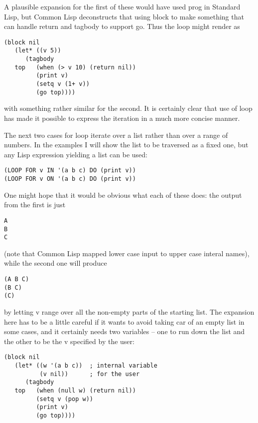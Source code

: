 A plausible expansion for the first of these would have used {\tx prog}
in Standard Lisp, but Common Lisp deconstructs that using {\tx block} to
make something that can handle {\tx return} and {\tx tagbody} to support
{\tx go}. Thus the loop might render as
{\small\begin{verbatim}
(block nil
   (let* ((v 5))
      (tagbody
   top   (when (> v 10) (return nil))
         (print v)
         (setq v (1+ v))
         (go top))))
\end{verbatim}}
with something rather similar for the second. It is certainly clear that
use of {\tx loop} has made it possible to express the iteration in a much
more concise manner.

The next two cases for {\tx loop} iterate over a list rather than over
a range of numbers. In the examples I will show the list to be traversed
as a fixed one, but any Lisp expression yielding a list can be
used:
{\small\begin{verbatim}
(LOOP FOR v IN '(a b c) DO (print v))
(LOOP FOR v ON '(a b c) DO (print v))
\end{verbatim}}
One might hope that it would be obvious what each of these does: the output
from the first is just
{\small\begin{verbatim}
A
B
C
\end{verbatim}}
(note that Common Lisp mapped lower case input to upper case interal names),
while the second one will produce
{\small\begin{verbatim}
(A B C)
(B C)
(C)
\end{verbatim}}
by letting {\tx v} range over all the non-empty parts of the starting list.
The expansion here has to be a little careful if it wants to avoid
taking {\tx car} of an empty list in some cases, and it certainly needs
two variables -- one to run down the list and the other to be the {\tx v}
specified by the user:
{\small\begin{verbatim}
(block nil
   (let* ((w '(a b c))  ; internal variable
          (v nil))      ; for the user
      (tagbody
   top   (when (null w) (return nil))
         (setq v (pop w))
         (print v)
         (go top))))
\end{verbatim}}


